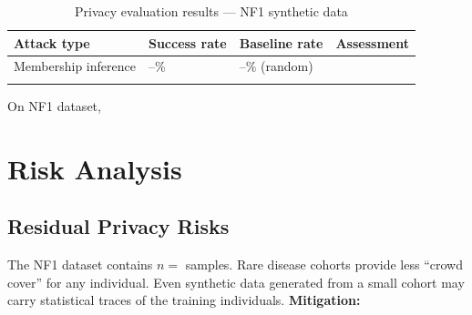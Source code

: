 \documentclass[webpdf,contemporary,large]{oup-authoring-template}%
\theoremstyle{thmstyleone}%
\theoremstyle{thmstyletwo}%
\theoremstyle{thmstylethree}%
\begin{document}
\begin{table}[!t]
\caption{Privacy evaluation results — NF1 synthetic data\label{tab:privacy_results}}
\begin{tabular}{L{4cm} C{2.5cm} C{2.5cm} L{3.5cm}}
  \toprule
  \textbf{Attack type} & \textbf{Success rate} & \textbf{Baseline rate} & \textbf{Assessment} \\
  \midrule
  Membership inference       & --\% & --\% (random) &  \\

  \botrule
\end{tabular}
\end{table}

\begin{findingbox}[title={NF1 datasets}]
  On NF1 dataset, 

\end{findingbox}

\section{Risk Analysis}
\label{sec:risk}

\subsection{Residual Privacy Risks}

\begin{riskbox}[title={Small cohort amplification}]
  The NF1 dataset contains $n = $  samples.
  Rare disease cohorts provide less ``crowd cover'' for any individual.
  Even synthetic data generated from a small cohort may carry
  statistical traces of the training individuals.
  \textbf{Mitigation:} 
\end{riskbox}
\end{document}
